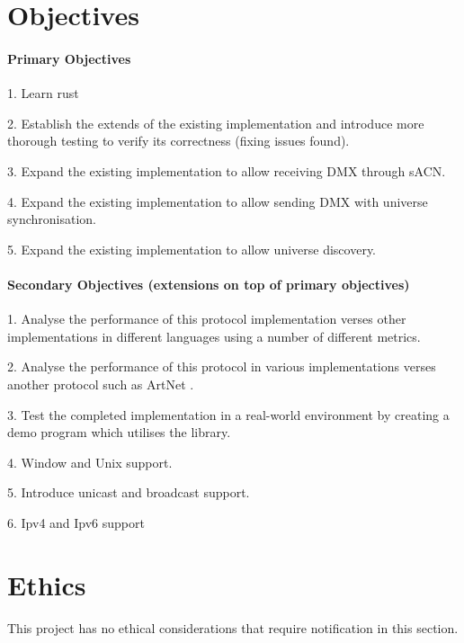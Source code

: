 \documentclass[12pt,a4paper,notitlepage]{report}
\begin{document}
\section*{Objectives}
\paragraph*{Primary Objectives}
\begin{list}{}{}
	\item 1. Learn rust
	\item 2. Establish the extends of the existing implementation and introduce more thorough testing to verify its correctness (fixing issues found).
	\item 3. Expand the existing implementation to allow receiving DMX through sACN.
	\item 4. Expand the existing implementation to allow sending DMX with universe synchronisation.
	\item 5. Expand the existing implementation to allow universe discovery.
\end{list}

\paragraph*{Secondary Objectives (extensions on top of primary objectives)}
\begin{list}{}{}
	\item 1. Analyse the performance of this protocol implementation verses other implementations in different languages using a number of different metrics.
	\item 2. Analyse the performance of this protocol in various implementations verses another protocol such as ArtNet \cite{ArtNet}.
	\item 3. Test the completed implementation in a real-world environment by creating a demo program which utilises the library. 
	\item 4. Window and Unix support.
	\item 5. Introduce unicast and broadcast support.
	\item 6. Ipv4 and Ipv6 support
\end{list}

\section*{Ethics}
This project has no ethical considerations that require notification in this section.
\end{document}
